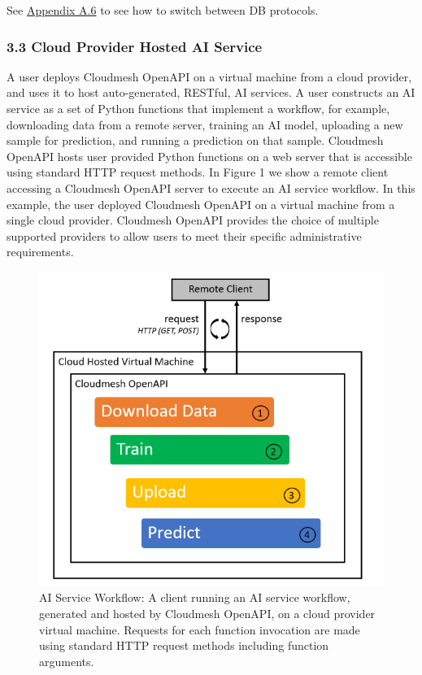 See
\protect\hyperlink{a6-switching-between-pickledb-and-mongodb}{Appendix
A.6} to see how to switch between DB protocols.

\hypertarget{cloud-provider-hosted-ai-service}{%
\subsubsection{3.3 Cloud Provider Hosted AI
Service}\label{cloud-provider-hosted-ai-service}}

A user deploys Cloudmesh OpenAPI on a virtual machine from a cloud
provider, and uses it to host auto-generated, RESTful, AI services. A
user constructs an AI service as a set of Python functions that
implement a workflow, for example, downloading data from a remote
server, training an AI model, uploading a new sample for prediction, and
running a prediction on that sample. Cloudmesh OpenAPI hosts user
provided Python functions on a web server that is accessible using
standard HTTP request methods. In Figure 1 we show a remote client
accessing a Cloudmesh OpenAPI server to execute an AI service workflow.
In this example, the user deployed Cloudmesh OpenAPI on a virtual
machine from a single cloud provider. Cloudmesh OpenAPI provides the
choice of multiple supported providers to allow users to meet their
specific administrative requirements.

\begin{figure}[htb]
\centering
\includegraphics[width=\columnwidth]{../images/ai-service-workflow.png}
\caption{AI Service Workflow: A client running an AI service workflow, generated
and hosted by Cloudmesh OpenAPI, on a cloud provider virtual machine.
Requests for each function invocation are made using standard HTTP
request methods including function arguments.
}
\label{fig:1}
\end{figure}



